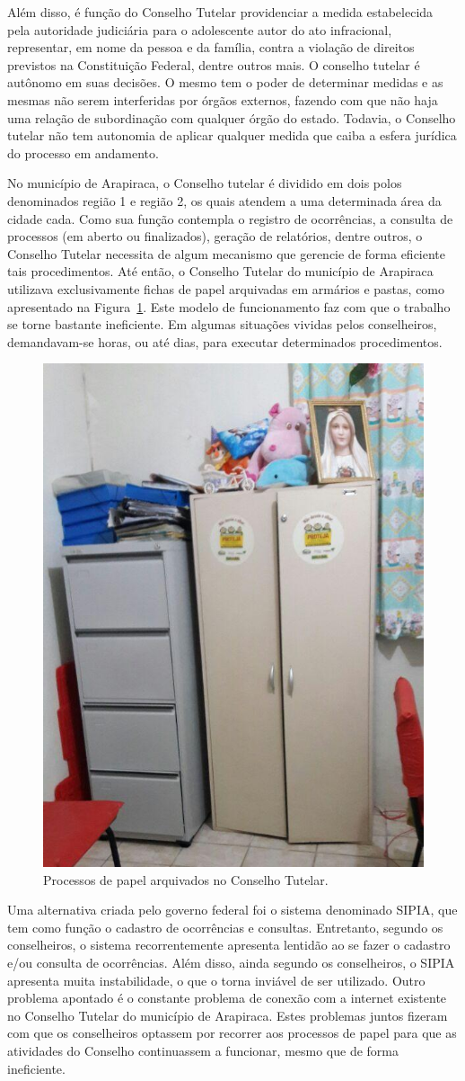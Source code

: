\documentclass[12pt]{article}
\begin{document}
Além disso, é função do Conselho Tutelar providenciar a medida estabelecida pela autoridade judiciária para o adolescente autor do ato infracional, representar, em nome da pessoa e da família, contra a violação de direitos previstos na Constituição Federal, dentre outros mais. O conselho tutelar é autônomo em suas decisões. O mesmo tem o poder de determinar medidas e as mesmas não serem interferidas por órgãos externos, fazendo com que não haja uma relação de subordinação com qualquer órgão do estado. Todavia, o Conselho tutelar não tem autonomia de aplicar qualquer medida que caiba a esfera jurídica do processo em andamento.

No município de Arapiraca, o Conselho tutelar é dividido em dois polos denominados região 1 e região 2, os quais atendem a uma determinada área da cidade cada. Como sua função contempla o registro de ocorrências, a consulta de processos (em aberto ou finalizados), geração de relatórios, dentre outros, o Conselho Tutelar necessita de algum mecanismo que gerencie de forma eficiente tais procedimentos. Até então, o Conselho Tutelar do município de Arapiraca utilizava exclusivamente fichas de papel arquivadas em armários e pastas, como apresentado na Figura~\ref{fig:arquivos}. Este modelo de funcionamento faz com que o trabalho se torne bastante ineficiente. Em algumas situações vividas pelos conselheiros, demandavam-se horas, ou até dias, para executar determinados procedimentos.

\begin{figure}[ht]
\centering
\includegraphics[width=.27\textwidth]{fig/1.jpg}
\caption{Processos de papel arquivados no Conselho Tutelar.}
\label{fig:arquivos}
\end{figure}

Uma alternativa criada pelo governo federal foi o sistema denominado SIPIA, que tem como função o cadastro de ocorrências e consultas. Entretanto, segundo os conselheiros, o sistema recorrentemente apresenta lentidão ao se fazer o cadastro e/ou consulta de ocorrências. Além disso, ainda segundo os conselheiros, o SIPIA apresenta muita instabilidade, o que o torna inviável de ser utilizado. Outro problema apontado é o constante problema de conexão com a internet existente no Conselho Tutelar do município de Arapiraca. Estes problemas juntos fizeram com que os conselheiros optassem por recorrer aos processos de papel para que as atividades do Conselho continuassem a funcionar, mesmo que de forma ineficiente.
\end{document}
